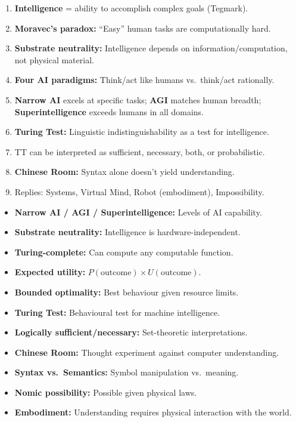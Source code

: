 \begin{thmbox}
\begin{enumerate}
  \item \textbf{Intelligence} = ability to accomplish complex goals (Tegmark).
  \item \textbf{Moravec's paradox:} ``Easy'' human tasks are computationally hard.
  \item \textbf{Substrate neutrality:} Intelligence depends on information/computation, not physical material.
  \item \textbf{Four AI paradigms:} Think/act like humans vs.\ think/act rationally.
  \item \textbf{Narrow AI} excels at specific tasks; \textbf{AGI} matches human breadth; \textbf{Superintelligence} exceeds humans in all domains.
  \item \textbf{Turing Test:} Linguistic indistinguishability as a test for intelligence.
  \item TT can be interpreted as sufficient, necessary, both, or probabilistic.
  \item \textbf{Chinese Room:} Syntax alone doesn't yield understanding.
  \item Replies: Systems, Virtual Mind, Robot (embodiment), Impossibility.
\end{enumerate}
\end{thmbox}

\begin{defbox}
\begin{itemize}
  \item \textbf{Narrow AI / AGI / Superintelligence:} Levels of AI capability.
  \item \textbf{Substrate neutrality:} Intelligence is hardware-independent.
  \item \textbf{Turing-complete:} Can compute any computable function.
  \item \textbf{Expected utility:} $P(\text{outcome}) \times U(\text{outcome})$.
  \item \textbf{Bounded optimality:} Best behaviour given resource limits.
  \item \textbf{Turing Test:} Behavioural test for machine intelligence.
  \item \textbf{Logically sufficient/necessary:} Set-theoretic interpretations.
  \item \textbf{Chinese Room:} Thought experiment against computer understanding.
  \item \textbf{Syntax vs.\ Semantics:} Symbol manipulation vs.\ meaning.
  \item \textbf{Nomic possibility:} Possible given physical laws.
  \item \textbf{Embodiment:} Understanding requires physical interaction with the world.
\end{itemize}
\end{defbox}

